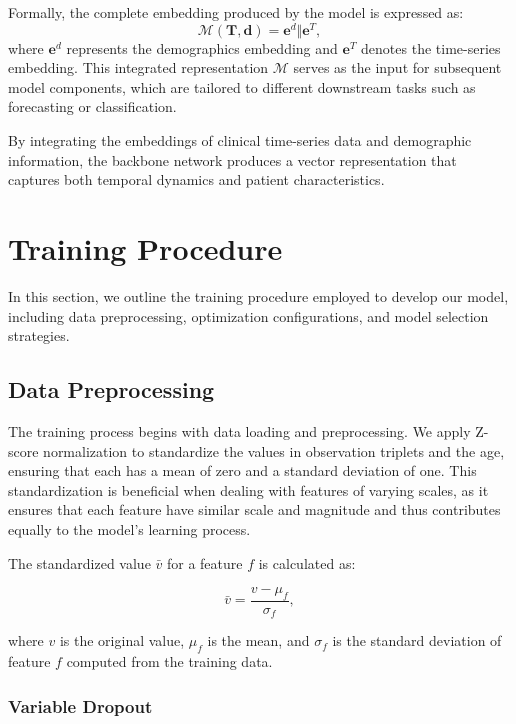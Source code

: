 Formally, the complete embedding produced by the model is expressed as:
\[
\mathcal{M}(\mathbf{T}, \mathbf{d}) = \mathbf{e}^d \Vert \mathbf{e}^T,
\]
where \( \mathbf{e}^d \) represents the demographics embedding and \( \mathbf{e}^T \) denotes the time-series embedding. This integrated representation \( \mathcal{M} \) serves as the input for subsequent model components, which are tailored to different downstream tasks such as forecasting or classification.


By integrating the embeddings of clinical time-series data and demographic information, the backbone network produces a vector representation that captures both temporal dynamics and patient characteristics.

\section{Training Procedure}
\label{sec:training_procedure}

In this section, we outline the training procedure employed to develop our model, including data preprocessing, optimization configurations, and model selection strategies.

\subsection{Data Preprocessing}

The training process begins with data loading and preprocessing. We apply Z-score normalization to standardize the values in observation triplets and the age, ensuring that each has a mean of zero and a standard deviation of one. This standardization is beneficial when dealing with features of varying scales, as it ensures that each feature have similar scale and magnitude and thus contributes equally to the model's learning process.

The standardized value \( \bar{v} \) for a feature \( f \) is calculated as:

\[
\bar{v} = \frac{v - \mu_f}{\sigma_f},
\]

where \( v \) is the original value, \( \mu_f \) is the mean, and \( \sigma_f \) is the standard deviation of feature \( f \) computed from the training data.

\subsubsection*{Variable Dropout}
\label{sec:variable_dropout}

